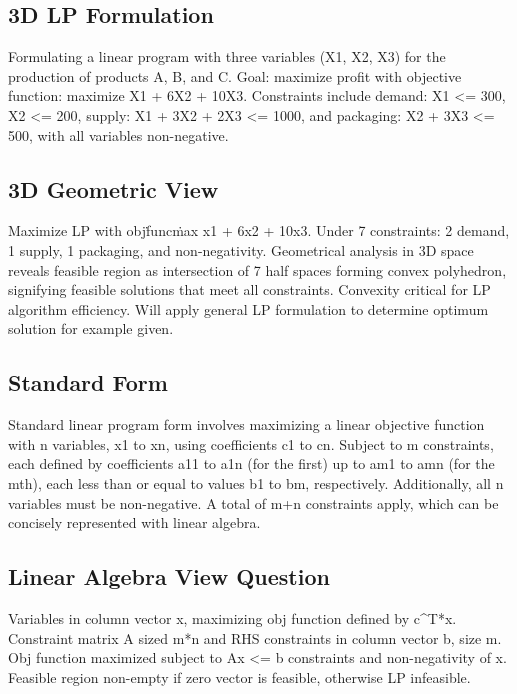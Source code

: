 \subsection*{3D LP Formulation}
Formulating a linear program with three variables (X1, X2, X3) for the production of products A, B, and C\@.
Goal: maximize profit with objective function: maximize X1 + 6X2 + 10X3.
Constraints include demand: X1 \textless{}= 300, X2 \textless{}= 200, supply: X1 + 3X2 + 2X3 \textless{}= 1000, and packaging: X2 + 3X3 \textless{}= 500, with all variables non-negative.

\subsection*{3D Geometric View}
Maximize LP with obj\. func\. max x1 + 6x2 + 10x3.
Under 7 constraints: 2 demand, 1 supply, 1 packaging, and non-negativity.
Geometrical analysis in 3D space reveals feasible region as intersection of 7 half spaces forming convex polyhedron, signifying feasible solutions that meet all constraints.
Convexity critical for LP algorithm efficiency.
Will apply general LP formulation to determine optimum solution for example given.

\subsection*{Standard Form}
Standard linear program form involves maximizing a linear objective function with n variables, x1 to xn, using coefficients c1 to cn.
Subject to m constraints, each defined by coefficients a11 to a1n (for the first) up to am1 to amn (for the mth), each less than or equal to values b1 to bm, respectively.
Additionally, all n variables must be non-negative.
A total of m+n constraints apply, which can be concisely represented with linear algebra.

\subsection*{Linear Algebra View Question}
Variables in column vector x, maximizing obj function defined by c\textasciicircum{}T*x.
Constraint matrix A sized m*n and RHS constraints in column vector b, size m.
Obj function maximized subject to Ax \textless{}= b constraints and non-negativity of x.
Feasible region non-empty if zero vector is feasible, otherwise LP infeasible.

